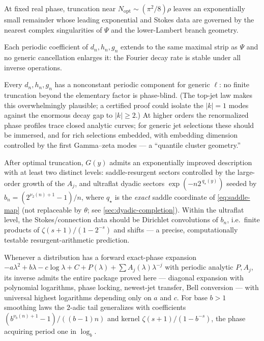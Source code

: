 \documentclass[11pt,oneside]{article}
\numberwithin{equation}{section}
\theoremstyle{definition}
\theoremstyle{remark}
\newcommand{\vtwo}{\nu_2}
\newcommand{\abs}[1]{\left\lvert #1\right\rvert}
\begin{document}
\begin{conjecture}
\label{conj:optimal-truncation}
At fixed real phase, truncation near
$N_{\mathrm{opt}}\sim(\pi^{2}/8)\rho$ leaves an exponentially small
remainder whose leading exponential and Stokes data are governed by
the nearest complex singularities of $\Psi$ and the lower-Lambert
branch geometry.
\end{conjecture}

\begin{conjecture}
\label{conj:strip-sharp}
Each periodic coefficient of $d_n,h_n,g_n$ extends to the same
maximal strip as $\Psi$ and no generic cancellation enlarges it: the
Fourier decay rate is stable under all inverse operations.
\end{conjecture}

\begin{conjecture}
\label{conj:nonconstant-phase}
Every $d_n,h_n,g_n$ has a nonconstant periodic component for generic
$\ell$: no finite truncation beyond the elementary factor is
phase-blind.  (The top-jet law makes this overwhelmingly plausible;
a certified proof could isolate the $\abs k=1$ modes against the
enormous decay gap to $\abs k\ge2$.)  At higher orders the
renormalized phase profiles trace closed analytic curves; for generic
jet selections these should be immersed, and for rich selections
embedded, with embedding dimension controlled by the first
Gamma--zeta modes --- a ``quantile cluster geometry.''
\end{conjecture}

\begin{conjecture}
\label{conj:transseries}
After optimal truncation, $G(y)$ admits an exponentially improved
description with at least two distinct levels: saddle-resurgent
sectors controlled by the large-order growth of the $A_j$, and
ultraflat dyadic sectors
$\exp(-n2^{\,q_\star(y)})$ seeded by
$b_n=(2^{\vtwo(n)+1}-1)/n$, where $q_\star$ is the \emph{exact}
saddle coordinate of \eqref{eq:saddle-map} (not replaceable by
$\theta$; see \cref{sec:dyadic-completion}).  Within the ultraflat
level, the Stokes/connection data should be Dirichlet convolutions
of $b_n$, i.e.\ finite products of
$\zeta(s+1)/(1-2^{-s})$ and shifts --- a precise, computationally
testable resurgent-arithmetic prediction.
\end{conjecture}

\begin{conjecture}
\label{conj:universal-class}
Whenever a distribution has a forward exact-phase expansion
$-a\lambda^{2}+b\lambda-c\log\lambda+C+P(\lambda)
+\sum A_j(\lambda)\lambda^{-j}$ with periodic analytic
$P,A_j$, its inverse admits the entire package proved here ---
diagonal expansion with polynomial logarithms, phase locking,
newest-jet transfer, Bell conversion --- with universal highest
logarithms depending only on $a$ and $c$.  For base
$b>1$ smoothing laws the $2$-adic tail generalizes with coefficients
$(b^{\nu_b(n)+1}-1)/((b-1)n)$ and kernel
$\zeta(s+1)/(1-b^{-s})$, the phase acquiring period one in
$\log_b$.
\end{conjecture}
\end{document}
